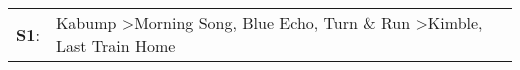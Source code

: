 \begin{supertabular}{p{0.03\textwidth}p{0.92\textwidth}}
 \textbf{S1}:  &  Kabump\textsuperscript{} \textgreater \enspace Morning Song\textsuperscript{}, \enspace Blue Echo\textsuperscript{}, \enspace Turn \& Run\textsuperscript{} \textgreater \enspace Kimble\textsuperscript{}, \enspace Last Train Home\textsuperscript{}  \enspace  \\
\end{supertabular}
